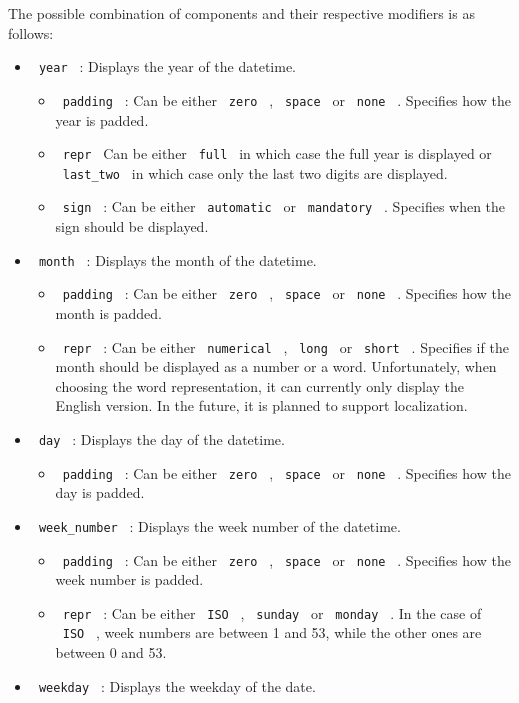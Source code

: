 The possible combination of components and their respective modifiers is
as follows:

\begin{itemize}
\tightlist
\item
  \texttt{\ year\ } : Displays the year of the datetime.

  \begin{itemize}
  \tightlist
  \item
    \texttt{\ padding\ } : Can be either \texttt{\ zero\ } ,
    \texttt{\ space\ } or \texttt{\ none\ } . Specifies how the year is
    padded.
  \item
    \texttt{\ repr\ } Can be either \texttt{\ full\ } in which case the
    full year is displayed or \texttt{\ last\_two\ } in which case only
    the last two digits are displayed.
  \item
    \texttt{\ sign\ } : Can be either \texttt{\ automatic\ } or
    \texttt{\ mandatory\ } . Specifies when the sign should be
    displayed.
  \end{itemize}
\item
  \texttt{\ month\ } : Displays the month of the datetime.

  \begin{itemize}
  \tightlist
  \item
    \texttt{\ padding\ } : Can be either \texttt{\ zero\ } ,
    \texttt{\ space\ } or \texttt{\ none\ } . Specifies how the month is
    padded.
  \item
    \texttt{\ repr\ } : Can be either \texttt{\ numerical\ } ,
    \texttt{\ long\ } or \texttt{\ short\ } . Specifies if the month
    should be displayed as a number or a word. Unfortunately, when
    choosing the word representation, it can currently only display the
    English version. In the future, it is planned to support
    localization.
  \end{itemize}
\item
  \texttt{\ day\ } : Displays the day of the datetime.

  \begin{itemize}
  \tightlist
  \item
    \texttt{\ padding\ } : Can be either \texttt{\ zero\ } ,
    \texttt{\ space\ } or \texttt{\ none\ } . Specifies how the day is
    padded.
  \end{itemize}
\item
  \texttt{\ week\_number\ } : Displays the week number of the datetime.

  \begin{itemize}
  \tightlist
  \item
    \texttt{\ padding\ } : Can be either \texttt{\ zero\ } ,
    \texttt{\ space\ } or \texttt{\ none\ } . Specifies how the week
    number is padded.
  \item
    \texttt{\ repr\ } : Can be either \texttt{\ ISO\ } ,
    \texttt{\ sunday\ } or \texttt{\ monday\ } . In the case of
    \texttt{\ ISO\ } , week numbers are between 1 and 53, while the
    other ones are between 0 and 53.
  \end{itemize}
\item
  \texttt{\ weekday\ } : Displays the weekday of the date.


\end{itemize}
